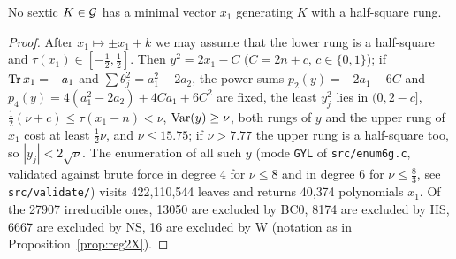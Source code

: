 \begin{proposition}\label{prop:reg2Y}No sextic $K\in\mathcal{G}$ has a minimal vector $x_1$ generating $K$ with a half-square rung.\end{proposition}\begin{proof}After $x_1\mapsto\pm x_1+k$ we may assume that the lower rung is a half-square and $\tau(x_1)\in[-\frac12,\frac12]$. Then $y^{2}=2x_1-C$ ($C=2n+c$, $c\in\{0,1\}$); if $\operatorname{Tr} x_1=-a_1$ and $\sum\theta_j^{2}=a_1^{2}-2a_2$, the power sums $p_2(y)=-2a_1-6C$ and $p_4(y)=4(a_1^{2}-2a_2)+4Ca_1+6C^{2}$ are fixed, the least $y_j^{2}$ lies in $(0,2-c]$, $\frac12(\nu+c)\le\tau(x_1-n)<\nu$, $\operatorname{Var}(y)\ge\nu$, both rungs of $y$ and the upper rung of $x_1$ cost at least $\frac12\nu$, and $\nu\le15.75$; if $\nu>7.77$ the upper rung is a half-square too, so $|y_j|<2\sqrt\nu$. The enumeration of all such $y$ (mode \texttt{GYL} of \texttt{src/enum6g.c}, validated against brute force in degree $4$ for $\nu\le8$ and in degree $6$ for $\nu\le\frac83$, see \texttt{src/validate/}) visits 422{,}110{,}544 leaves and returns 40{,}374 polynomials $x_1$. Of the 27907 irreducible ones, 13050 are excluded by BC0, 8174 are excluded by HS, 6667 are excluded by NS, 16 are excluded by W (notation as in Proposition~\ref{prop:reg2X}).\end{proof}
